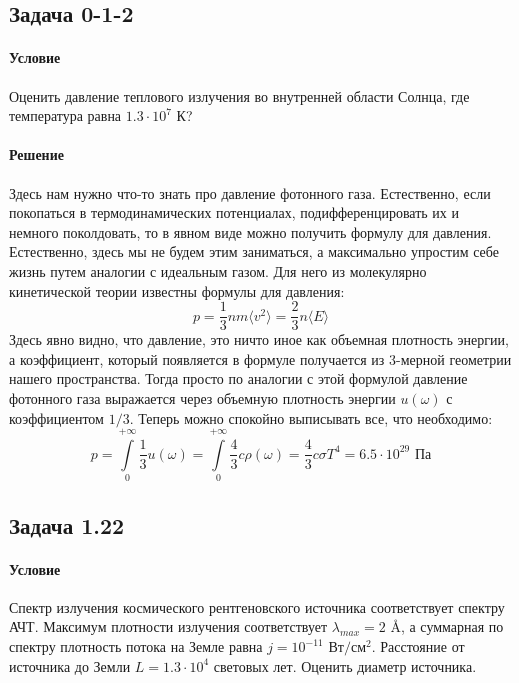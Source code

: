 \documentclass[12pt]{article}
\begin{document}
\subsection{Задача 0-1-2}
\label{task_012}
\paragraph{Условие}
Оценить давление теплового излучения во внутренней области Солнца, где температура равна $1.3\cdot 10^7$ К?
\paragraph{Решение}
Здесь нам нужно что-то знать про давление фотонного газа. Естественно,  если покопаться в термодинамических потенциалах, подифференцировать их и немного поколдовать, то в явном виде можно получить формулу для давления. Естественно, здесь мы не будем этим заниматься, а максимально упростим себе жизнь путем аналогии с идеальным газом. Для него из молекулярно кинетической теории известны формулы для давления:
\begin{equation*}
    p=\dfrac{1}{3}nm\langle v^2\rangle = \dfrac{2}{3} n \langle E \rangle
\end{equation*}
Здесь явно видно, что давление, это ничто иное как объемная плотность энергии, а коэффициент, который появляется в формуле получается из 3-мерной геометрии нашего пространства. Тогда просто по аналогии с этой формулой давление фотонного газа выражается через объемную плотность энергии $u(\omega)$ с коэффициентом $1/3$. Теперь можно спокойно выписывать все, что необходимо:
\begin{equation*}
    p=\int\limits_0^{+\infty}\dfrac{1}{3}u(\omega) = \int\limits_0^{+\infty}\dfrac{4}{3}c\rho(\omega) = \dfrac{4}{3}c\sigma T^4 = 6.5\cdot 10^{29} \text{ Па}
\end{equation*}
\subsection{Задача 1.22}
\label{task_122}
\paragraph{Условие}
Спектр излучения космического рентгеновского источника соответствует спектру АЧТ. Максимум плотности излучения соответствует $\lambda_{max} = 2$ \AA, а суммарная по спектру плотность потока на Земле равна $j = 10^{-11} \text{ Вт}/\text{см}^2$. Расстояние от источника до Земли $L = 1.3\cdot 10^4$ световых лет. Оценить диаметр источника. 
\end{document}
